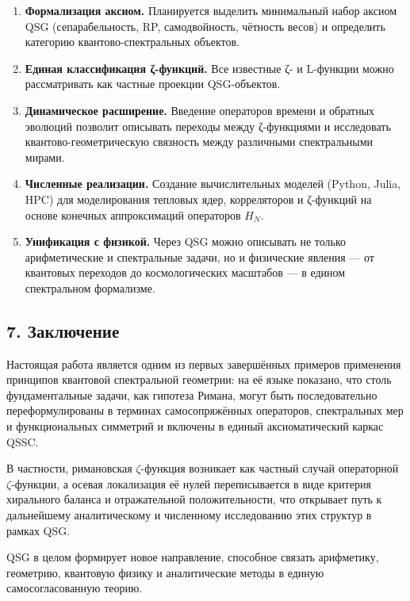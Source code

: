 \documentclass{article}
\numberwithin{equation}{section}
\theoremstyle{plain}
\theoremstyle{definition}
\theoremstyle{remark}
\begin{document}
\begin{enumerate}
\item \textbf{Формализация аксиом.}
Планируется выделить минимальный набор аксиом QSG (сепарабельность, RP, самодвойность, чётность весов)  
и определить категорию квантово-спектральных объектов.

\item \textbf{Единая классификация ζ-функций.}
Все известные ζ- и L-функции можно рассматривать как частные проекции QSG-объектов.

\item \textbf{Динамическое расширение.}
Введение операторов времени и обратных эволюций позволит описывать переходы между ζ-функциями  
и исследовать квантово-геометрическую связность между различными спектральными мирами.

\item \textbf{Численные реализации.}
Создание вычислительных моделей (Python, Julia, HPC) для моделирования тепловых ядер, корреляторов и ζ-функций  
на основе конечных аппроксимаций операторов \(H_N\).

\item \textbf{Унификация с физикой.}
Через QSG можно описывать не только арифметические и спектральные задачи,  
но и физические явления — от квантовых переходов до космологических масштабов —  
в едином спектральном формализме.
\end{enumerate}

\subsection*{7. Заключение}

Настоящая работа является одним из первых завершённых примеров применения принципов
квантовой спектральной геометрии: на её языке показано, что столь фундаментальные задачи,
как гипотеза Римана, могут быть последовательно переформулированы в терминах
самосопряжённых операторов, спектральных мер и функциональных симметрий и включены
в единый аксиоматический каркас QSSC.

В частности, римановская $\zeta$-функция возникает как частный случай операторной
$\zeta$-функции, а осевая локализация её нулей переписывается в виде критерия
хирального баланса и отражательной положительности, что открывает путь к дальнейшему
аналитическому и численному исследованию этих структур в рамках QSG.

QSG в целом формирует новое направление, способное связать
арифметику, геометрию, квантовую физику и аналитические методы
в единую самосогласованную теорию.
\end{document}
